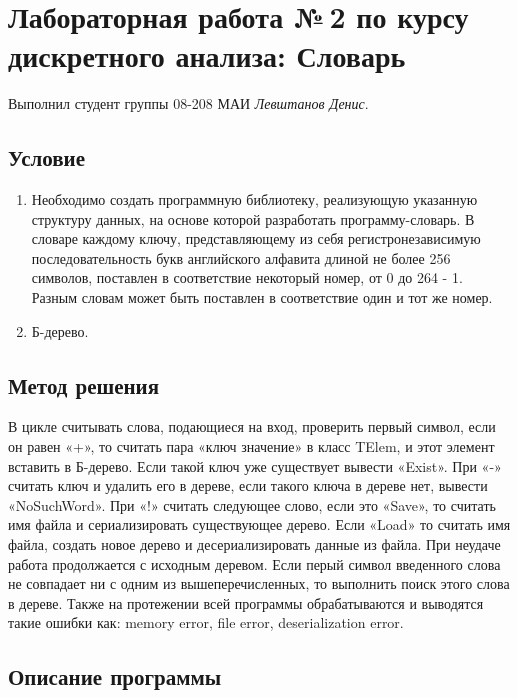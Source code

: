 \documentclass[12pt]{article}
\begin{document}
\section*{Лабораторная работа №\,2 по курсу дискретного анализа: Словарь}

Выполнил студент группы 08-208 МАИ \textit{Левштанов Денис}.

\subsection*{Условие}

\begin{enumerate}
\item Необходимо создать программную библиотеку, реализующую указанную структуру данных, на основе которой разработать программу-словарь. В словаре каждому ключу, представляющему из себя регистронезависимую последовательность букв английского алфавита длиной не более 256 символов, поставлен в соответствие некоторый номер, от 0 до 264 - 1. Разным словам может быть поставлен в соответствие один и тот же номер.
\item Б-дерево.
\end{enumerate}

\subsection*{Метод решения}
В цикле считывать слова, подающиеся на вход, проверить первый символ, если он равен «+», то считать пара «ключ значение» в класс TElem, и этот элемент вставить в Б-дерево. Если  такой ключ уже существует вывести «Exist».  При «-» считать ключ и удалить его в дереве, если такого ключа в дереве нет, вывести «NoSuchWord». При «!» считать следующее слово, если это «Save», то считать имя файла и сериализировать существующее дерево. Если «Load» то считать имя файла, создать новое дерево и десериализировать данные из файла. При неудаче работа продолжается с исходным деревом. Если перый символ введенного слова не совпадает ни с одним из вышеперечисленных, то выполнить поиск этого слова в дереве. Также на протежении всей программы обрабатываются и выводятся такие ошибки как: memory error, file error, deserialization error.

\subsection*{Описание программы}
\end{document}
